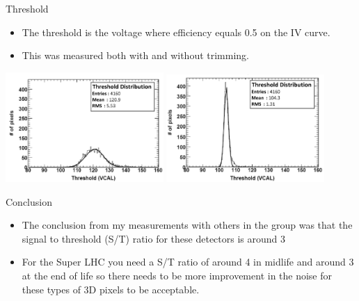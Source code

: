 \documentclass{beamer}
\begin{document}
\begin{frame}{Threshold}
  \begin{center}
    \begin{itemize}
    \item
      The threshold is the voltage where efficiency equals 0.5 on the IV curve.
    \item
      This was measured both with and without trimming.
    \end{itemize}
\includegraphics[width=0.45\textwidth]{images/threshold1.pdf}
\includegraphics[width=0.45\textwidth]{images/threshold2.pdf}

  \end{center}
\end{frame}

\begin{frame}{Conclusion}
  \begin{center}
    \begin{itemize}
    \item
      The conclusion from my measurements with others in the group was that the signal to threshold (S/T) ratio for these detectors is around 3
    \item
  For the Super LHC you need a S/T ratio of around 4 in midlife and around 3 at the end of life so there needs to be more improvement in the noise for these types of 3D pixels to be acceptable.
    \end{itemize}
  \end{center}
\end{frame}
\end{document}
